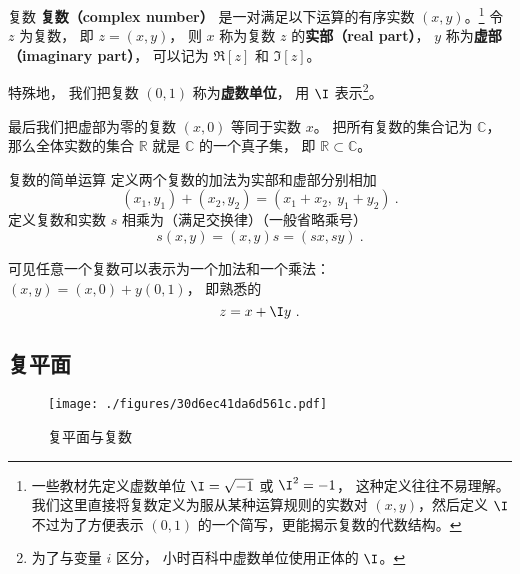 

\begin{definition}{复数}
\textbf{复数（complex number）} 是一对满足以下运算的有序实数 $(x,y)$。\footnote{一些教材先定义虚数单位 $\I = \sqrt{-1}$ 或 $\I^2 = -1$， 这种定义往往不易理解。 我们这里直接将复数定义为服从某种运算规则的实数对 $(x,y)$，然后定义 $\I$ 不过为了方便表示 $(0,1)$ 的一个简写，更能揭示复数的代数结构\cite{Rudin}。} 令 $z$ 为复数， 即 $z = (x, y)$， 则 $x$ 称为复数 $z$ 的\textbf{实部（real part）}， $y$ 称为\textbf{虚部（imaginary part）}， 可以记为 $\Re[z]$ 和 $\Im[z]$。

特殊地， 我们把复数 $(0, 1)$ 称为\textbf{虚数单位}， 用 $\I$ 表示\footnote{为了与变量 $i$ 区分， 小时百科中虚数单位使用正体的 $\I$。}。

最后我们把虚部为零的复数 $(x, 0)$ 等同于实数 $x$。 把所有复数的集合记为 $\mathbb C$， 那么全体实数的集合 $\mathbb R$ 就是 $\mathbb C$ 的一个真子集， 即 $\mathbb R \subset \mathbb C$。
\end{definition}

\begin{definition}{复数的简单运算}
定义两个复数的加法为实部和虚部分别相加
\begin{equation}\label{eq_CplxNo_1}
(x_1, y_1) + (x_2, y_2) = (x_1+ x_2,\ y_1 + y_2)~.
\end{equation}
定义复数和实数 $s$ 相乘为（满足交换律）（一般省略乘号）
\begin{equation}\label{eq_CplxNo_4}
s(x, y) = (x, y)s = (sx, sy)~.
\end{equation}
\end{definition}

可见任意一个复数可以表示为一个加法和一个乘法： $(x, y) = (x, 0) + y(0, 1)$， 即熟悉的
\begin{equation}
z = x + \I y~.
\end{equation}

\subsection{复平面}
\begin{figure}[ht]
\centering
\texttt{[image: ./figures/30d6ec41da6d561c.pdf]}
\caption{复平面与复数} \label{fig_CplxNo_1}
\end{figure}

